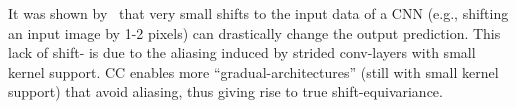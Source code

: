 It was shown by~\cite{azulay2018deep,zhang2019shiftinvar} that very small shifts to the input data of a CNN (e.g., shifting an input image by 1-2 pixels) can drastically change the output prediction. This lack of shift-  is due to the aliasing induced by strided conv-layers with small kernel support. CC enables more ``gradual-architectures'' (still with small kernel support) that avoid aliasing, thus giving rise to true shift-equivariance.





